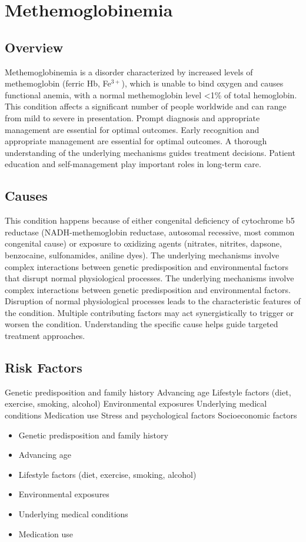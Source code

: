 \chapter{Methemoglobinemia}
\label{sec:Methemoglobinemia}

\section{Overview}
Methemoglobinemia is a disorder characterized by increased levels of methemoglobin (ferric Hb, Fe$^{3+}$), which is unable to bind oxygen and causes functional anemia, with a normal methemoglobin level <1\% of total hemoglobin. This condition affects a significant number of people worldwide and can range from mild to severe in presentation. Prompt diagnosis and appropriate management are essential for optimal outcomes. Early recognition and appropriate management are essential for optimal outcomes. A thorough understanding of the underlying mechanisms guides treatment decisions. Patient education and self-management play important roles in long-term care.
\section{Causes}
This condition happens because of either congenital deficiency of cytochrome b5 reductase (NADH-methemoglobin reductase, autosomal recessive, most common congenital cause) or exposure to oxidizing agents (nitrates, nitrites, dapsone, benzocaine, sulfonamides, aniline dyes). The underlying mechanisms involve complex interactions between genetic predisposition and environmental factors that disrupt normal physiological processes. The underlying mechanisms involve complex interactions between genetic predisposition and environmental factors. Disruption of normal physiological processes leads to the characteristic features of the condition. Multiple contributing factors may act synergistically to trigger or worsen the condition. Understanding the specific cause helps guide targeted treatment approaches.
\section{Risk Factors}
Genetic predisposition and family history Advancing age Lifestyle factors (diet, exercise, smoking, alcohol) Environmental exposures Underlying medical conditions Medication use Stress and psychological factors Socioeconomic factors

\begin{itemize}[noitemsep]
  \item Genetic predisposition and family history
  \item Advancing age
  \item Lifestyle factors (diet, exercise, smoking, alcohol)
  \item Environmental exposures
  \item Underlying medical conditions
  \item Medication use
\end{itemize}
